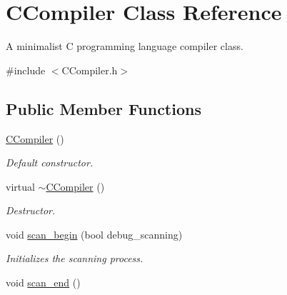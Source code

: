 \hypertarget{classCCompiler}{\section{C\-Compiler Class Reference}
\label{classCCompiler}
}


A minimalist C programming language compiler class.  




{\ttfamily \#include $<$C\-Compiler.\-h$>$}

\subsection*{Public Member Functions}
\begin{DoxyCompactItemize}
\item 
\hypertarget{classCCompiler_aa2bf25daa08b040296dab6f21b5b514b}{\hyperlink{classCCompiler_aa2bf25daa08b040296dab6f21b5b514b}{C\-Compiler} ()}\label{classCCompiler_aa2bf25daa08b040296dab6f21b5b514b}

\begin{DoxyCompactList}\small\item\em Default constructor. \end{DoxyCompactList}\item 
\hypertarget{classCCompiler_a9143fdbd61eb03813adfddb51d3bbded}{virtual \hyperlink{classCCompiler_a9143fdbd61eb03813adfddb51d3bbded}{$\sim$\-C\-Compiler} ()}\label{classCCompiler_a9143fdbd61eb03813adfddb51d3bbded}

\begin{DoxyCompactList}\small\item\em Destructor. \end{DoxyCompactList}\item 
void \hyperlink{classCCompiler_a52d92c3695f753176bfb14cbf544f398}{scan\-\_\-begin} (bool debug\-\_\-scanning)
\begin{DoxyCompactList}\small\item\em Initializes the scanning process. \end{DoxyCompactList}\item 
\hypertarget{classCCompiler_a304e3789eb84bfa2a2e2ef21f84abf12}{void \hyperlink{classCCompiler_a304e3789eb84bfa2a2e2ef21f84abf12}{scan\-\_\-end} ()}\label{classCCompiler_a304e3789eb84bfa2a2e2ef21f84abf12}


\end{DoxyCompactItemize}

